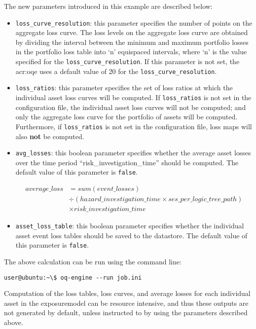 The new parameters introduced in this example are described below:

\begin{itemize}

  \item \Verb+loss_curve_resolution+: this parameter specifies the number of
    points on the aggregate loss curve. The loss levels on the aggregate loss
    curve are obtained by dividing the interval between the minimum and maximum
    portfolio losses in the portfolio loss table into `n' equispaced intervals,
    where `n' is the value specified for the \Verb+loss_curve_resolution+.
    If this parameter is not set, the \glsdesc{acr:oqe} uses a default value of
    20 for the \Verb+loss_curve_resolution+.

  \item \Verb+loss_ratios+: this parameter specifies the set of loss ratios at
    which the individual asset loss curves will be computed. If
    \Verb+loss_ratios+ is not set in the configuration file, the individual 
    asset loss curves will not be computed; and only the aggregate loss curve
    for the portfolio of assets will be computed. Furthermore, if
    \Verb+loss_ratios+ is not set in the configuration file, loss maps will
    also \textbf{not} be computed.

  \item \Verb+avg_losses+: this boolean parameter specifies whether the average
    asset losses over the time period ``risk\_investigation\_time'' should be
    computed. The default value of this parameter is \Verb+false+.

    \begin{equation*}
    \begin{split}
    average\_loss & = sum(event\_losses) \\
                 & \div (hazard\_investigation\_time \times ses\_per\_logic\_tree\_path) \\
                 & \times risk\_investigation\_time
    \end{split}
    \end{equation*}

  \item \Verb+asset_loss_table+: this boolean parameter specifies whether the
    individual asset event loss tables should be saved to the datastore. 
    The default value of this parameter is \Verb+false+.

\end{itemize}

The above calculation can be run using the command line:

\begin{verbatim}
user@ubuntu:~\$ oq-engine --run job.ini
\end{verbatim}

Computation of the loss tables, loss curves, and average losses for each
individual \gls{asset} in the \gls{exposuremodel} can be resource intensive,
and thus these outputs are not generated by default, unless instructed to by
using the parameters described above.
